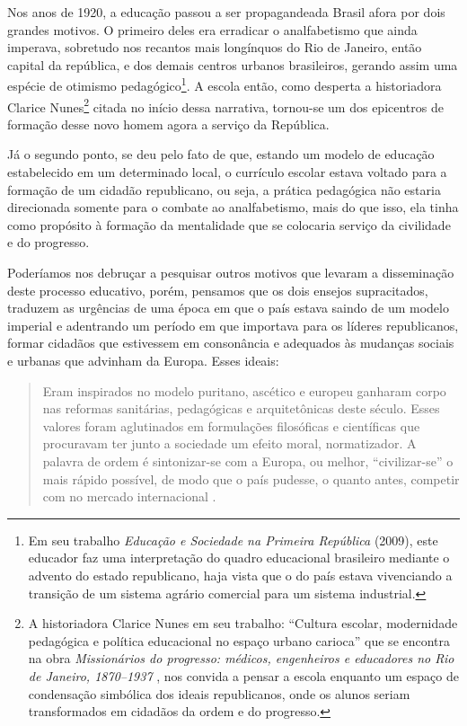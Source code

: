 \begin{refsection}
Nos anos de 1920, a educação passou a ser propagandeada Brasil afora por dois grandes motivos. O primeiro deles era erradicar o analfabetismo que ainda imperava, sobretudo nos recantos mais longínquos do Rio de Janeiro, então capital da república, e dos demais centros urbanos brasileiros, gerando assim uma espécie de otimismo pedagógico\footnote{\cite[p.~261]{Nagle2009Educacao} Em seu trabalho \textit{Educação e Sociedade na Primeira República} (2009), este educador faz uma interpretação do quadro educacional brasileiro mediante o advento do estado republicano, haja vista que o do país estava vivenciando a transição de um sistema agrário comercial para um sistema industrial.}.  A escola então, como desperta a historiadora Clarice Nunes\footnote{A historiadora Clarice Nunes em seu trabalho: ``Cultura escolar, modernidade pedagógica e política educacional no espaço urbano carioca'' que se encontra na obra \textit{Missionários do progresso: médicos, engenheiros e educadores no Rio de Janeiro, 1870--1937} \citeyear{Nunes1996Cultura}, nos convida a pensar a escola enquanto um espaço de condensação simbólica dos ideais republicanos, onde os alunos seriam transformados em cidadãos da ordem e do progresso.} citada no início dessa narrativa, tornou-se um dos epicentros de formação desse novo homem agora a serviço da República.

Já o segundo ponto, se deu pelo fato de que, estando um modelo de educação estabelecido em um determinado local, o currículo escolar estava voltado para a formação de um cidadão republicano, ou seja, a prática pedagógica não estaria direcionada somente para o combate ao analfabetismo, mais do que isso, ela tinha como propósito à formação da mentalidade que se colocaria serviço da civilidade e do progresso.  

Poderíamos nos debruçar a pesquisar outros motivos que levaram a disseminação deste processo educativo, porém, pensamos que os dois ensejos supracitados, traduzem as urgências de uma época em que o país estava saindo de um modelo imperial e adentrando um período em que importava para os líderes republicanos, formar cidadãos que estivessem em consonância e adequados às mudanças sociais e urbanas que advinham da Europa. Esses ideais: 

\begin{quotation}
    Eram inspirados no modelo puritano, ascético e europeu ganharam corpo nas reformas sanitárias, pedagógicas e arquitetônicas deste século. Esses valores foram aglutinados em formulações filosóficas e científicas que procuravam ter junto a sociedade um efeito moral, normatizador. A palavra de ordem é sintonizar-se com a Europa, ou melhor, ``civilizar-se'' o mais rápido possível, de modo que o país pudesse, o quanto antes, competir com no mercado internacional \cite[p.~26]{HerschmannAndPereira1994Invencao}.
\end{quotation}


\end{refsection}
